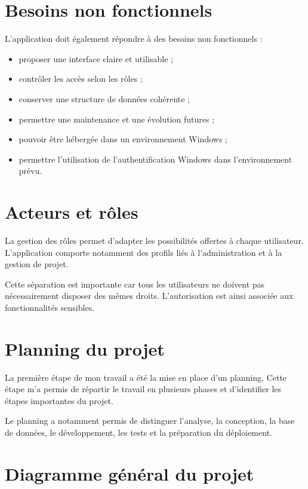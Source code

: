\documentclass[12pt,a4paper,oneside]{report}
\begin{document}
\section{Besoins non fonctionnels}

L'application doit également répondre à des besoins non fonctionnels :

\begin{itemize}
    \item proposer une interface claire et utilisable ;
    \item contrôler les accès selon les rôles ;
    \item conserver une structure de données cohérente ;
    \item permettre une maintenance et une évolution futures ;
    \item pouvoir être hébergée dans un environnement Windows ;
    \item permettre l'utilisation de l'authentification Windows dans l'environnement prévu.
\end{itemize}

\section{Acteurs et rôles}

La gestion des rôles permet d'adapter les possibilités offertes à chaque utilisateur. L'application comporte notamment des profils liés à l'administration et à la gestion de projet.

Cette séparation est importante car tous les utilisateurs ne doivent pas nécessairement disposer des mêmes droits. L'autorisation est ainsi associée aux fonctionnalités sensibles.

\section{Planning du projet}

La première étape de mon travail a été la mise en place d'un planning. Cette étape m'a permis de répartir le travail en plusieurs phases et d'identifier les étapes importantes du projet.

Le planning a notamment permis de distinguer l'analyse, la conception, la base de données, le développement, les tests et la préparation du déploiement.

\section{Diagramme général du projet}
\end{document}
